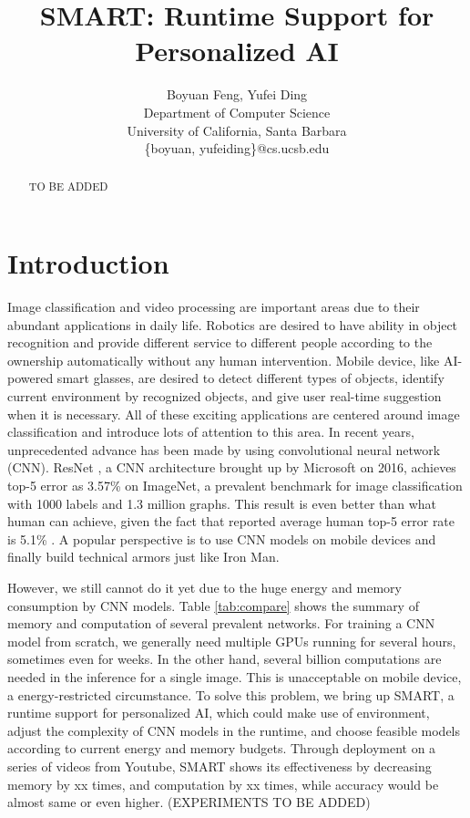 \documentclass{article}
\title{SMART: Runtime Support for Personalized AI}
\author{
Boyuan Feng, 
Yufei Ding
\\ 
Department of Computer Science \\
University of California, Santa Barbara \\
\{boyuan, yufeiding\}@cs.ucsb.edu
}
\begin{document}
\maketitle

\begin{abstract}
    TO BE ADDED
\end{abstract}

\section{Introduction}
Image classification and video processing are important areas due to their abundant applications in daily life. Robotics are desired to have ability in object recognition and provide different service to different people according to the ownership automatically without any human intervention. Mobile device, like AI-powered smart glasses, are desired to detect different types of objects, identify current environment by recognized objects, and give user real-time suggestion when it is necessary. All of these exciting applications are centered around image classification and introduce lots of attention to this area. In recent years, unprecedented advance has been made by using convolutional neural network (CNN). ResNet \cite{he2016deep}, a CNN architecture brought up by Microsoft on 2016, achieves top-5 error as 3.57\% on ImageNet, a prevalent benchmark for image classification with 1000 labels and 1.3 million graphs. This result is even better than what human can achieve, given the fact that reported average human top-5 error rate is 5.1\% \cite{russakovsky2015imagenet}. A popular perspective is to use CNN models on mobile devices and finally build technical armors just like Iron Man.

However, we still cannot do it yet due to the huge energy and memory consumption by CNN models. Table \ref{tab:compare} shows the summary of memory and computation of several prevalent networks. For training a CNN model from scratch, we generally need multiple GPUs running for several hours, sometimes even for weeks. In the other hand, several billion computations are needed in the inference for a single image. This is unacceptable on mobile device, a energy-restricted circumstance. To solve this problem, we bring up SMART, a runtime support for personalized AI, which could make use of environment, adjust the complexity of CNN models in the runtime, and choose feasible models according to current energy and memory budgets. Through deployment on a series of videos from Youtube, SMART shows its effectiveness by decreasing memory by xx times, and computation by xx times, while accuracy would be almost same or even higher. (EXPERIMENTS TO BE ADDED)
\end{document}
